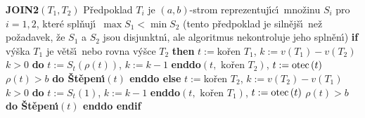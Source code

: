 {\bf JOIN2$\left(T_1,T_2\right)$}\newline
P\v redpoklad $T_i$ je $\left(a,b\right)$-strom reprezentuj\'\i c\'\i\ 
mno\v zinu $S_i$ pro $i=1,2$, kter\'e spl\v nuj\'\i\ $\max S_1<\min 
S_2$ 
(tento p\v redpoklad je siln\v ej\v s\'\i\ ne\v z po\v zadavek, \v ze $
S_1$ a 
$S_2$ jsou disjunktn\'\i , ale algoritmus nekontroluje jeho spln\v en\'\i )\newline 
{\bf if} v\'y\v ska $T_1$ je v\v et\v s\'\i\ nebo rovna v\'y\v sce $T_2$ {\bf then}\newline 
\phantom{---}$t:=$ko\v ren $T_1$, $k:=v\left(T_1\right)-v\left(T_2\right)$\newline 
\phantom{---}{\bf while} $k>0$ {\bf do} $t:=S_t\left(\rho \left(t\right)\right)$, $k:=k-1$ {\bf enddo}\newline \phantom{---}{\bf Spojen\'\i}$\left(t,\text{ ko\v ren }T_2\right)$, $t:=\operatorname{otec}\left(t\right)$\newline 
\phantom{---}{\bf while} $\rho \left(t\right)>b$ {\bf do \v St\v epen\'\i$\left(t\right)$ enddo\newline 
else}\newline 
\phantom{---}$t:=$ko\v ren $T_2$, $k:=v\left(T_2\right)-v\left(T_1\right)$ \newline 
\phantom{---}{\bf while} $k>0$ {\bf do} $t:=S_t\left(1\right)$, $k:=k-1$ {\bf enddo}\newline \phantom{---}{\bf Spojen\'\i}$\left(t,\text{ ko\v ren }T_1\right)$, $t:=\operatorname{otec}\left(t\right)$\newline 
\phantom{---}{\bf while} $\rho \left(t\right)>b$ {\bf do \v St\v epen\'\i$\left(t\right)$ enddo\newline 
endif}
\medskip

